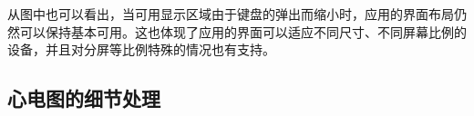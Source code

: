 \begin{figure}[!ht]
    \centering
    \label{fig:history-time-picker}
\end{figure}

从图中也可以看出，当可用显示区域由于键盘的弹出而缩小时，应用的界面布局仍然可以保持基本可用。这也体现了应用的界面可以适应不同尺寸、不同屏幕比例的设备，并且对分屏等比例特殊的情况也有支持。

\subsection{心电图的细节处理}\label{subsec:ecg}

